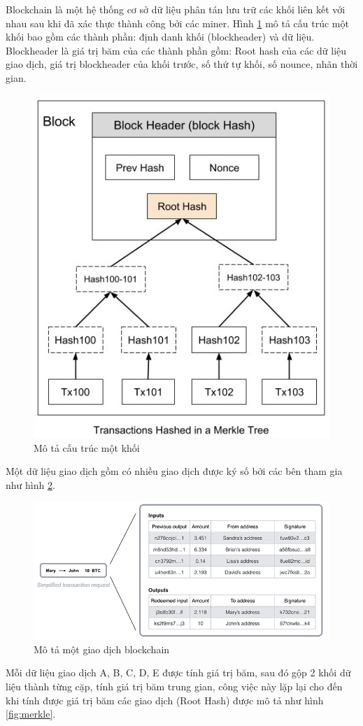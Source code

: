 Blockchain là một hệ thống cơ sở dữ liệu phân tán lưu trữ các khối liên kết với nhau sau khi đã xác thực thành công bởi các miner. Hình \ref{fig:merkle_bitcoin} mô tả cấu trúc một khối bao gồm các thành phần: định danh khối (blockheader) và dữ liệu.
Blockheader là giá trị băm của các thành phần gồm: Root hash của các dữ liệu giao dịch, giá trị blockheader của khối trước, số thứ tự khối, số nounce, nhãn thời gian.

\begin{figure}[htbp]
\centering
\includegraphics[width=.5\linewidth]{img/merkle_tree.jpg}
\caption{Mô tả cấu trúc một khối}
\label{fig:merkle_bitcoin}
\end{figure}

Một dữ liệu giao dịch gồm có nhiều giao dịch được ký số bởi các bên tham gia như hình \ref{fig:trans_bitcoin}.

\begin{figure}[htbp]
\centering
\includegraphics[width=.9\linewidth]{img/trans_bitcoin.png}
\caption{Mô tả một giao dịch blockchain}
\label{fig:trans_bitcoin}
\end{figure}

Mỗi dữ liệu giao dịch A, B, C, D, E được tính giá trị băm, sau đó gộp 2 khối dữ liệu thành từng cặp, tính giá trị băm trung gian, công việc này lặp lại cho đến khi tính được giá trị băm các giao dịch (Root Hash) được mô tả như hình \ref{fig:merkle}. 

